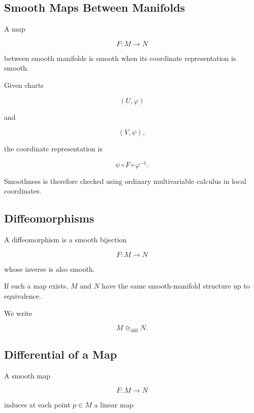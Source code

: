 \subsection{Smooth Maps Between Manifolds}
\label{subsec:smooth-maps-manifolds}

A map

\[
F:M\to N
\]

between smooth manifolds is smooth when its coordinate representation is
smooth.

Given charts

\[
(U,\varphi)
\]

and

\[
(V,\psi),
\]

the coordinate representation is

\[
\boxed{
\psi\circ F\circ\varphi^{-1}.
}
\]

Smoothness is therefore checked using ordinary multivariable calculus in
local coordinates.

\subsection{Diffeomorphisms}
\label{subsec:manifold-diffeomorphisms}

A diffeomorphism is a smooth bijection

\[
F:M\to N
\]

whose inverse is also smooth.

If such a map exists, \(M\) and \(N\) have the same smooth-manifold
structure up to equivalence.

We write

\[
\boxed{
M\cong_{\mathrm{diff}}N.
}
\]

\subsection{Differential of a Map}
\label{subsec:manifold-differential-map}

A smooth map

\[
F:M\to N
\]

induces at each point \(p\in M\) a linear map


